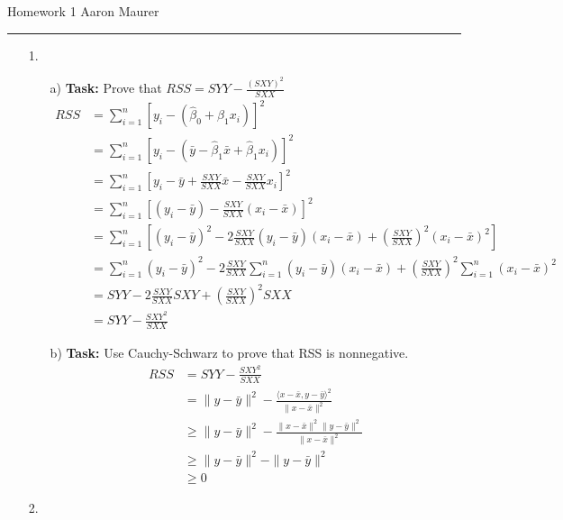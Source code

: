 \documentclass[11pt]{article}
\theoremstyle{definition}
\begin{document}
Homework 1 \hfill Aaron Maurer
\hrule
\begin{enumerate}
    \item[1.]
        \begin{enumerate}
            \item[a)]
                \textbf{Task:} Prove that $RSS = SYY - \frac{(SXY)^2}{SXX}$
                \begin{align*}
                    RSS &= \sum_{i=1}^n \left [y_i - (\hat{\beta}_0 + \hat{\beta}_1 x_i) \right ]^2
                    \\ &= \sum_{i=1}^n \left [y_i - (\bar{y} - \hat{\beta}_1 \bar{x} + \hat{\beta}_1 x_i) \right ]^2 
                    \\ &= \sum_{i=1}^n \left [y_i - \bar{y} + \frac{SXY}{SXX} \bar{x} - \frac{SXY}{SXX} x_i \right ]^2
                    \\ &= \sum_{i=1}^n \left [(y_i - \bar{y}) - \frac{SXY}{SXX} (x_i - \bar{x}) \right ]^2
                    \\ &= \sum_{i=1}^n \left [(y_i - \bar{y})^2 - 2 \frac{SXY}{SXX}(y_i - \bar{y})(x_i - \bar{x}) + \left(\frac{SXY}{SXX}\right)^2 (x_i - \bar{x})^2 \right ]
                    \\ &= \sum_{i=1}^n (y_i - \bar{y})^2 - 2 \frac{SXY}{SXX}\sum_{i=1}^n (y_i - \bar{y})(x_i - \bar{x}) + \left(\frac{SXY}{SXX}\right)^2 \sum_{i=1}^n (x_i - \bar{x})^2
                    \\ &= SYY - 2\frac{SXY}{SXX}SXY + \left(\frac{SXY}{SXX}\right)^2SXX
                    \\ &= SYY - \frac{SXY^2}{SXX}
                \end{align*}
            \item[b)]
                \textbf{Task:} Use Cauchy-Schwarz to prove that RSS is nonnegative.
                \begin{align*}
                    RSS &= SYY - \frac{SXY^2}{SXX}
                    \\ &=  \|y-\bar{y}\|^2 - \frac{\langle x - \bar{x}, y - \bar{y} \rangle^2}{\|x-\bar{x}\|^2}
                    \\ &\geq \|y-\bar{y}\|^2 - \frac{\|x-\bar{x}\|^2 \|y-\bar{y}\|^2}{\|x-\bar{x}\|^2}
                    \\ &\geq \|y-\bar{y}\|^2 - \|y-\bar{y}\|^2
                    \\ &\geq 0
                \end{align*}
        \end{enumerate}
    \item[2.]

\end{enumerate}
\end{document}
